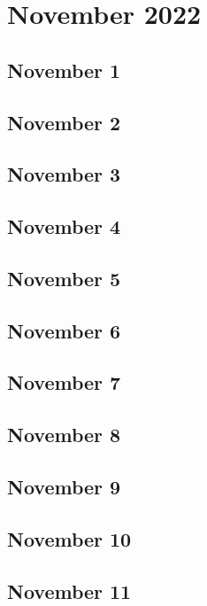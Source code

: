 \chapter{November 2022}

\section{November 1}

\section{November 2}

\section{November 3}

\section{November 4}

\section{November 5}

\section{November 6}

\section{November 7}

\section{November 8}

\section{November 9}

\section{November 10}

\section{November 11}

